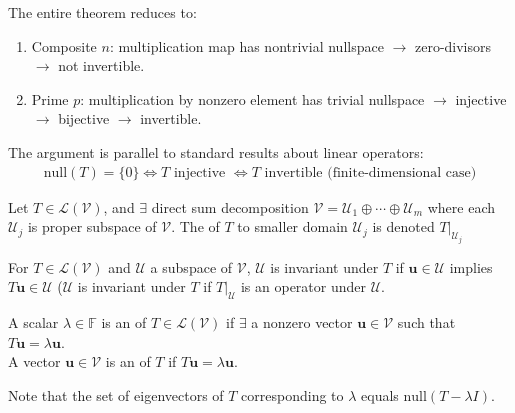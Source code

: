 The entire theorem reduces to:
\begin{enumerate}[label=\roman*.]
\setlength{\itemsep}{0pt}
\item Composite $n$: multiplication map has nontrivial nullspace $\rightarrow$ zero-divisors $\rightarrow$ not invertible.
\item Prime $p$: multiplication by nonzero element has trivial nullspace $\rightarrow$ injective $\rightarrow$ bijective $\rightarrow$ invertible.
\end{enumerate}
The argument is parallel to standard results about linear operators:
\begin{align}
\text{null}(T) = \{ 0 \} \Leftrightarrow T \text{ injective } \Leftrightarrow T \text{ invertible (finite-dimensional case)} \nonumber
\end{align}

\begin{definition} Let $T \in \mathcal{L}(\mathcal{V})$, and $\exists$ direct sum decomposition $\mathcal{V} = \mathcal{U}_1 \oplus \cdots \oplus \mathcal{U}_m$ where each $\mathcal{U}_j$ is proper subspace of $\mathcal{V}$. The  of $T$ to smaller domain $\mathcal{U}_j$ is denoted $T|_{\mathcal{U}_j}$
\end{definition}

\begin{definition} For $T \in \mathcal{L}(\mathcal{V})$ and $\mathcal{U}$ a subspace of $\mathcal{V}$, $\mathcal{U}$ is invariant under $T$ if $\mathbf{u} \in \mathcal{U}$ implies $T \mathbf{u} \in \mathcal{U}$ ($\mathcal{U}$ is invariant under $T$ if $T|_{\mathcal{U}}$ is an operator under $\mathcal{U}$.
\end{definition}

\begin{definition} A scalar $\lambda \in \mathbb{F}$ is an  of $T \in \mathcal{L}(\mathcal{V})$ if $\exists$ a nonzero vector $\mathbf{u} \in \mathcal{V}$ such that $T \mathbf{u} = \lambda \mathbf{u}$.\\
A vector $\mathbf{u} \in \mathcal{V}$ is an  of $T$ if $T \mathbf{u} = \lambda \mathbf{u}$.
\end{definition}

Note that the set of eigenvectors of $T$ corresponding to $\lambda$ equals $\text{null}(T - \lambda I)$.

